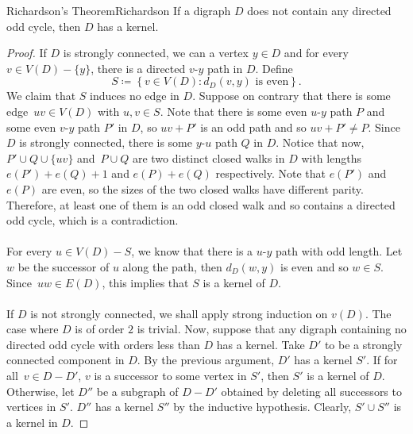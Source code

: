 \documentclass[math]{amznotes}
\theoremstyle{remark}
\begin{document}
\begin{thmbox}{Richardson's Theorem}{Richardson}
    If a digraph $D$ does not contain any directed odd cycle, then $D$ has a kernel.
    \tcblower
    \begin{proof}
        If $D$ is strongly connected, we can a vertex $y \in D$ and for every $v \in V(D) - \{y\}$, there is a directed $v$-$y$ path in $D$. Define 
        \begin{equation*}
            S \coloneqq \left\{v \in V(D) \colon d_{D}(v, y) \textrm{ is even}\right\}.
        \end{equation*}
        We claim that $S$ induces no edge in $D$. Suppose on contrary that there is some edge~$uv \in V(D)$ with $u, v \in S$. Note that there is some even $u$-$y$ path $P$ and some even $v$-$y$ path $P'$ in $D$, so $uv + P'$ is an odd path and so $uv + P' \neq P$. Since $D$ is strongly connected, there is some $y$-$u$ path $Q$ in $D$. Notice that now, $P' \cup Q \cup \{uv\}$ and~$P \cup Q$ are two distinct closed walks in $D$ with lengths $e(P') + e(Q) + 1$ and $e(P) + e(Q)$ respectively. Note that $e(P')$ and $e(P)$ are even, so the sizes of the two closed walks have different parity. Therefore, at least one of them is an odd closed walk and so contains a directed odd cycle, which is a contradiction.
        \\\\
        For every $u \in V(D) - S$, we know that there is a $u$-$y$ path with odd length. Let $w$ be the successor of $u$ along the path, then $d_D(w, y)$ is even and so $w \in S$. Since~$uw \in E(D)$, this implies that $S$ is a kernel of $D$.
        \\\\
        If $D$ is not strongly connected, we shall apply strong induction on $v(D)$. The case where $D$ is of order $2$ is trivial. Now, suppose that any digraph containing no directed odd cycle with orders less than $D$ has a kernel. Take $D'$ to be a strongly connected component in $D$. By the previous argument, $D'$ has a kernel $S'$. If for all~$v \in D - D'$, $v$ is a successor to some vertex in $S'$, then $S'$ is a kernel of $D$. Otherwise, let $D''$ be a subgraph of $D - D'$ obtained by deleting all successors to vertices in $S'$. $D''$ has a kernel $S''$ by the inductive hypothesis. Clearly, $S' \cup S''$ is a kernel in $D$.
    \end{proof}
\end{thmbox}
\end{document}
